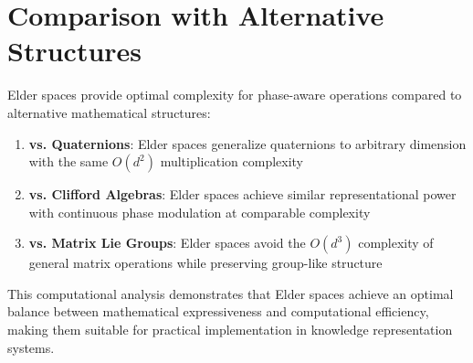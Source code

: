 \section{Comparison with Alternative Structures}

\begin{theorem}
Elder spaces provide optimal complexity for phase-aware operations compared to alternative mathematical structures:
\begin{enumerate}
    \item \textbf{vs. Quaternions}: Elder spaces generalize quaternions to arbitrary dimension with the same $O(d^2)$ multiplication complexity
    \item \textbf{vs. Clifford Algebras}: Elder spaces achieve similar representational power with continuous phase modulation at comparable complexity
    \item \textbf{vs. Matrix Lie Groups}: Elder spaces avoid the $O(d^3)$ complexity of general matrix operations while preserving group-like structure
\end{enumerate}
\end{theorem}

This computational analysis demonstrates that Elder spaces achieve an optimal balance between mathematical expressiveness and computational efficiency, making them suitable for practical implementation in knowledge representation systems.